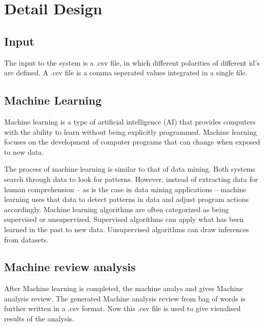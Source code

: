 \section{Detail Design}

\subsection{Input}
The input to the system is a .csv file, in which different polarities of different id's are defined. A .csv file is a comma seperated values integrated in a single file.

\subsection{Machine Learning}
Machine learning is a type of artificial intelligence (AI) that provides computers with the ability to learn without being explicitly programmed. Machine learning focuses on the development of computer programs that can change when exposed to new data.

The process of machine learning is similar to that of data mining. Both systems search through data to look for patterns. However, instead of extracting data for human comprehension -- as is the case in data mining applications -- machine learning uses that data to detect patterns in data and adjust program actions accordingly.  Machine learning algorithms are often categorized as being supervised or unsupervized. Supervised algorithms can apply what has been learned in the past to new data. Unsupervised algorithms can draw inferences from datasets.

\subsection{Machine review analysis}

After Machine learning is completed, the machine analys and gives Machine analysis review. The generated Machine analysis review from bag of words is further written in a .csv format. Now this .csv file is used to give visualised results of the analysis.

